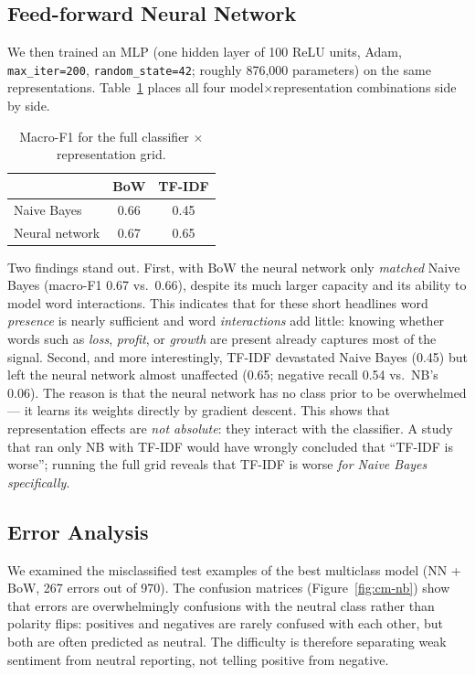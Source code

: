 \documentclass[sigconf,nonacm]{acmart}
\begin{document}
\subsection{Feed-forward Neural Network}

We then trained an MLP (one hidden layer of 100 ReLU units, Adam, \texttt{max\_iter=200}, \texttt{random\_state=42}; roughly 876{,}000 parameters) on the same representations. Table~\ref{tab:grid} places all four model$\times$representation combinations side by side.

\begin{table}[t]
\centering
\caption{Macro-F1 for the full classifier $\times$ representation grid.}
\label{tab:grid}
\begin{tabular}{lcc}
\toprule
 & BoW & TF-IDF \\
\midrule
Naive Bayes      & 0.66 & 0.45 \\
Neural network   & 0.67 & 0.65 \\
\bottomrule
\end{tabular}
\end{table}

Two findings stand out. First, with BoW the neural network only \emph{matched} Naive Bayes (macro-F1 0.67 vs.\ 0.66), despite its much larger capacity and its ability to model word interactions. This indicates that for these short headlines word \emph{presence} is nearly sufficient and word \emph{interactions} add little: knowing whether words such as \textit{loss}, \textit{profit}, or \textit{growth} are present already captures most of the signal. Second, and more interestingly, TF-IDF devastated Naive Bayes (0.45) but left the neural network almost unaffected (0.65; negative recall 0.54 vs.\ NB's 0.06). The reason is that the neural network has no class prior to be overwhelmed --- it learns its weights directly by gradient descent. This shows that representation effects are \emph{not absolute}: they interact with the classifier. A study that ran only NB with TF-IDF would have wrongly concluded that ``TF-IDF is worse''; running the full grid reveals that TF-IDF is worse \emph{for Naive Bayes specifically}.

\subsection{Error Analysis}

We examined the misclassified test examples of the best multiclass model (NN + BoW, 267 errors out of 970). The confusion matrices (Figure~\ref{fig:cm-nb}) show that errors are overwhelmingly confusions with the neutral class rather than polarity flips: positives and negatives are rarely confused with each other, but both are often predicted as neutral. The difficulty is therefore separating weak sentiment from neutral reporting, not telling positive from negative.
\end{document}
